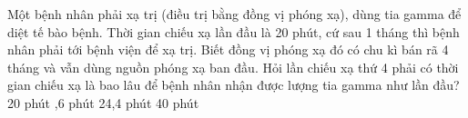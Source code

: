 \begin{vidu*}%
	Một bệnh nhân phải xạ trị (điều trị bằng đồng vị phóng xạ), dùng tia gamma để diệt tế bào bệnh. Thời gian chiếu xạ lần đầu là 20 phút, cứ sau 1 tháng thì bệnh nhân phải tới bệnh viện để xạ trị. Biết đồng vị phóng xạ đó có chu kì bán rã 4 tháng và vẫn dùng nguồn phóng xạ ban đầu. Hỏi lần chiếu xạ thứ 4 phải có thời gian chiếu xạ là bao lâu để bệnh nhân nhận được lượng tia gamma như lần đầu?
	\choice
	{20 phút}
	{,6 phút}
	{24,4 phút}
	{40 phút}	
\end{vidu*}
